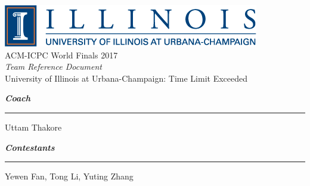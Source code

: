\documentclass[10pt]{article}
\begin{document}
\thispagestyle{empty}
\begin{center}
    \includegraphics[scale=0.7]{logo.png} \\
    \vspace{15mm}
    {\Huge ACM-ICPC World Finals 2017}\\
    \vspace{10mm}
    {\LARGE \textit{Team Reference Document}} \\
    \vspace{10mm}
    {\LARGE University of Illinois at Urbana-Champaign: Time Limit Exceeded} \\
    \vspace{30mm}
\end{center}

    {\Large \textbf{\textit{Coach}}}
    \vspace{5mm}
    \hrule
    \vspace{5mm}
    {\Large Uttam Thakore } \\
    \vspace{10mm}


    {\Large \textbf{\textit{Contestants}}}
    \vspace{5mm}
    \hrule
    \vspace{5mm}
    {\Large Yewen Fan, Tong Li, Yuting Zhang}
\end{document}
